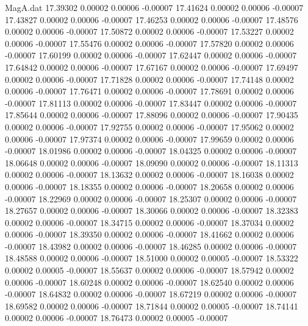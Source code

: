 \begin{filecontents}{MagA.dat}
  17.39302    0.00002    0.00006   -0.00007
  17.41624    0.00002    0.00006   -0.00007
  17.43827    0.00002    0.00006   -0.00007
  17.46253    0.00002    0.00006   -0.00007
  17.48576    0.00002    0.00006   -0.00007
  17.50872    0.00002    0.00006   -0.00007
  17.53227    0.00002    0.00006   -0.00007
  17.55476    0.00002    0.00006   -0.00007
  17.57820    0.00002    0.00006   -0.00007
  17.60199    0.00002    0.00006   -0.00007
  17.62447    0.00002    0.00006   -0.00007
  17.64842    0.00002    0.00006   -0.00007
  17.67167    0.00002    0.00006   -0.00007
  17.69497    0.00002    0.00006   -0.00007
  17.71828    0.00002    0.00006   -0.00007
  17.74148    0.00002    0.00006   -0.00007
  17.76471    0.00002    0.00006   -0.00007
  17.78691    0.00002    0.00006   -0.00007
  17.81113    0.00002    0.00006   -0.00007
  17.83447    0.00002    0.00006   -0.00007
  17.85644    0.00002    0.00006   -0.00007
  17.88096    0.00002    0.00006   -0.00007
  17.90435    0.00002    0.00006   -0.00007
  17.92755    0.00002    0.00006   -0.00007
  17.95062    0.00002    0.00006   -0.00007
  17.97374    0.00002    0.00006   -0.00007
  17.99659    0.00002    0.00006   -0.00007
  18.01986    0.00002    0.00006   -0.00007
  18.04325    0.00002    0.00006   -0.00007
  18.06648    0.00002    0.00006   -0.00007
  18.09090    0.00002    0.00006   -0.00007
  18.11313    0.00002    0.00006   -0.00007
  18.13632    0.00002    0.00006   -0.00007
  18.16038    0.00002    0.00006   -0.00007
  18.18355    0.00002    0.00006   -0.00007
  18.20658    0.00002    0.00006   -0.00007
  18.22969    0.00002    0.00006   -0.00007
  18.25307    0.00002    0.00006   -0.00007
  18.27657    0.00002    0.00006   -0.00007
  18.30066    0.00002    0.00006   -0.00007
  18.32383    0.00002    0.00006   -0.00007
  18.34715    0.00002    0.00006   -0.00007
  18.37034    0.00002    0.00006   -0.00007
  18.39350    0.00002    0.00006   -0.00007
  18.41662    0.00002    0.00006   -0.00007
  18.43982    0.00002    0.00006   -0.00007
  18.46285    0.00002    0.00006   -0.00007
  18.48588    0.00002    0.00006   -0.00007
  18.51000    0.00002    0.00005   -0.00007
  18.53322    0.00002    0.00005   -0.00007
  18.55637    0.00002    0.00006   -0.00007
  18.57942    0.00002    0.00006   -0.00007
  18.60248    0.00002    0.00006   -0.00007
  18.62540    0.00002    0.00006   -0.00007
  18.64832    0.00002    0.00006   -0.00007
  18.67219    0.00002    0.00006   -0.00007
  18.69582    0.00002    0.00006   -0.00007
  18.71844    0.00002    0.00005   -0.00007
  18.74141    0.00002    0.00006   -0.00007
  18.76473    0.00002    0.00005   -0.00007

\end{filecontents}
